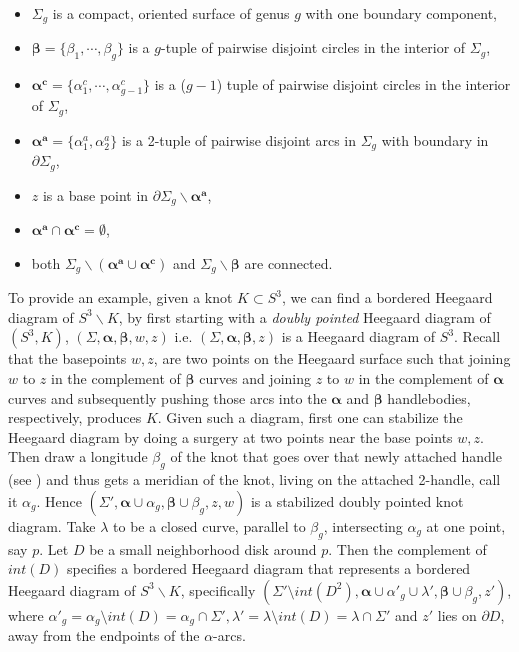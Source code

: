 \documentclass[11pt,reqno]{amsart}
\theoremstyle{definition}
\newtheorem *{remark}{Remark}
\begin{document}
\begin{itemize}
    \item $\Sigma_g$ is a compact, oriented surface of genus $g$ with one boundary component,
    \item $\bm{\beta} = \{\beta_1, \cdots, \beta_g\}$ is a $g$-tuple of pairwise disjoint circles in the interior of $\Sigma_g$,
    \item $\bm{\alpha^c} = \{\alpha_1^c, \cdots, \alpha_{g-1}^c\}$ is a ($g-1$) tuple of pairwise disjoint circles in the interior of $\Sigma_g$,
    \item $\bm{\alpha^a} = \{\alpha_1^a,\alpha_2^a\}$ is a 2-tuple of pairwise disjoint arcs in $\Sigma_g$ with boundary in $\partial \Sigma_g$,
    \item $z$ is a base point in $\partial \Sigma_g \smallsetminus  \bm{\alpha^a} $,
    \item $\bm{\alpha^a} \cap \bm{\alpha^c} = \emptyset$,
    \item both $\Sigma_g \smallsetminus (\bm{\alpha^a} \cup \bm{\alpha^c})$ and $\Sigma_g \smallsetminus \bm{\beta}$ are connected.
    
\end{itemize}

To provide an example, given a knot $K \subset S^3$, we can find a bordered Heegaard diagram of $S^3 \smallsetminus K$, by first starting with a \textit{doubly pointed} Heegaard diagram of $(S^3,K)$, $(\Sigma,\bm{\alpha},\bm{\beta},w,z)$ i.e. $ (\Sigma, \bm{\alpha},\bm{\beta},z)$ is a Heegaard diagram of $S^3$. Recall that the basepoints $w, z$, are two points on the Heegaard surface such that joining $w$ to $z$ in the complement of $\bm{\beta}$ curves and joining $z$ to $w$ in the complement of $\bm{\alpha}$ curves and subsequently pushing those arcs into the $\bm{\alpha}$ and $\bm{\beta}$ handlebodies, respectively, produces $K$. Given such a diagram, first one can stabilize the Heegaard diagram by doing a surgery at two points near the base points $w,z$. Then draw a longitude $\beta_g$ of the knot that goes over that newly attached handle (see \cite[Fig.4]{osknot04}) and thus gets a meridian of the knot, living on the attached 2-handle, call it $\alpha_g$.  Hence $(\Sigma', \bm{\alpha} \cup \alpha_g,\bm{\beta} \cup \beta_g, z,w )$ is a stabilized doubly pointed knot diagram. Take $\lambda$ to be a closed curve, parallel to $\beta_g$, intersecting $\alpha_g$ at one point, say $p$. Let $D$ be a small neighborhood disk around $p$.  Then the complement of $int(D)$ specifies a bordered Heegaard diagram that represents a bordered Heegaard diagram of $S^3 \smallsetminus K$, specifically $(\Sigma' \setminus int (D^2),\bm{\alpha} \cup \alpha'_g \cup \lambda', \bm{\beta} \cup \beta_g, z')$, where $\alpha'_g = \alpha_g \setminus int (D) = \alpha_g \cap \Sigma' , \lambda' = \lambda \setminus int(D) = \lambda \cap \Sigma'$ and $z'$ lies on $\partial D$, away from the endpoints of the $\alpha$-arcs.
\end{document}
